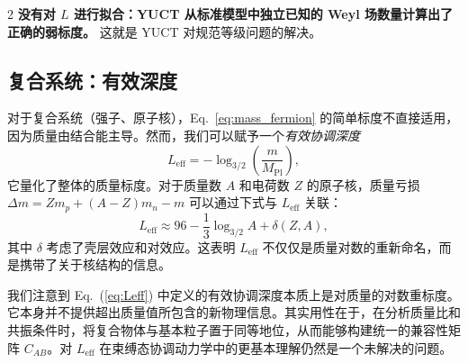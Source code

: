 \documentclass[11pt,a4paper]{article}
\begin{document}
\begin{multicols}{2}
		\textbf{没有对 $L$ 进行拟合：YUCT 从标准模型中独立已知的 Weyl 场数量计算出了正确的弱标度。} 这就是 YUCT 对规范等级问题的解决。
		
		\subsection{复合系统：有效深度}
		
		对于复合系统（强子、原子核），Eq.~\eqref{eq:mass_fermion} 的简单标度不直接适用，因为质量由结合能主导。然而，我们可以赋予一个\textit{有效协调深度}
		\begin{equation}
			L_{\mathrm{eff}} = -\log_{3/2}\left( \frac{m}{M_{\mathrm{Pl}}} \right),
			\label{eq:Leff}
		\end{equation}
		它量化了整体的质量标度。对于质量数 \(A\) 和电荷数 \(Z\) 的原子核，质量亏损 \(\Delta m = Z m_p + (A-Z) m_n - m\) 可以通过下式与 \(L_{\mathrm{eff}}\) 关联：
		\begin{equation}
			L_{\mathrm{eff}} \approx 96 - \frac{1}{3} \log_{3/2} A + \delta(Z,A),
		\end{equation}
		其中 \(\delta\) 考虑了壳层效应和对效应。这表明 \(L_{\mathrm{eff}}\) 不仅仅是质量对数的重新命名，而是携带了关于核结构的信息。
		
		我们注意到 Eq.~(\ref{eq:Leff}) 中定义的有效协调深度本质上是对质量的对数重标度。它本身并不提供超出质量值所包含的新物理信息。其实用性在于，在分析质量比和共振条件时，将复合物体与基本粒子置于同等地位，从而能够构建统一的兼容性矩阵 \(C_{AB}\)。对 \(L_{\mathrm{eff}}\) 在束缚态协调动力学中的更基本理解仍然是一个未解决的问题。
		
	\end{multicols}
	
	\vspace{2.0cm}
	
\end{document}

